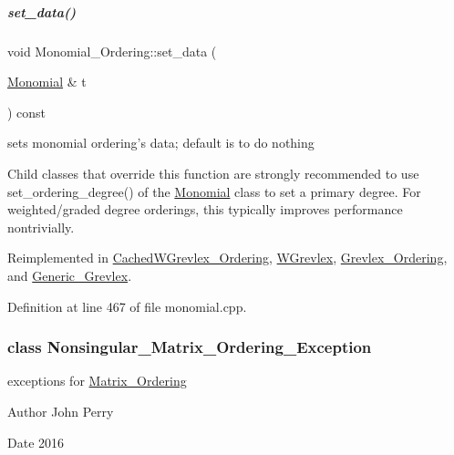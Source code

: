 \mbox{\label{group__orderinggroup_a22b08dffd1cdf3a655ca18d604cfcee1}} 
\subparagraph{\texorpdfstring{set\+\_\+data()}{set\_data()}}
{\footnotesize\ttfamily void Monomial\+\_\+\+Ordering\+::set\+\_\+data (\begin{DoxyParamCaption}\item[{\hyperlink{group__polygroup_class_monomial}{Monomial} \&}]{t }\end{DoxyParamCaption}) const\hspace{0.3cm}{\ttfamily [virtual]}}



sets monomial ordering's data; default is to do nothing 

Child classes that override this function are strongly recommended to use set\+\_\+ordering\+\_\+degree() of the \hyperlink{group__polygroup_class_monomial}{Monomial} class to set a primary degree. For weighted/graded degree orderings, this typically improves performance nontrivially. 

Reimplemented in \hyperlink{group__orderinggroup_a65f1e27ee52413c91ffcb87632dcb27c}{Cached\+W\+Grevlex\+\_\+\+Ordering}, \hyperlink{group__orderinggroup_a18ba60cd0a76da002303a11d362142d9}{W\+Grevlex}, \hyperlink{group__orderinggroup_a83abd3e7505fe2096b01b8146bfdd83f}{Grevlex\+\_\+\+Ordering}, and \hyperlink{group__orderinggroup_a14c344858da03d16c8019afdae3da5dc}{Generic\+\_\+\+Grevlex}.



Definition at line 467 of file monomial.\+cpp.

\label{class_nonsingular___matrix___ordering___exception}
\subsubsection{class Nonsingular\+\_\+\+Matrix\+\_\+\+Ordering\+\_\+\+Exception}
exceptions for \hyperlink{group__orderinggroup_class_matrix___ordering}{Matrix\+\_\+\+Ordering} 

\begin{DoxyAuthor}{Author}
John Perry 
\end{DoxyAuthor}
\begin{DoxyDate}{Date}
2016 
\end{DoxyDate}


